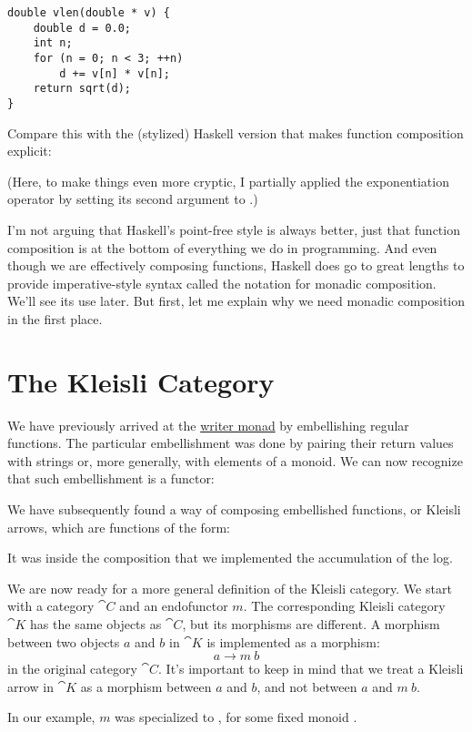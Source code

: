 \begin{Verbatim}
double vlen(double * v) {
    double d = 0.0;
    int n;
    for (n = 0; n < 3; ++n)
        d += v[n] * v[n];
    return sqrt(d);
}
\end{Verbatim}
Compare this with the (stylized) Haskell version that makes function
composition explicit:

(Here, to make things even more cryptic, I partially applied the
exponentiation operator \code{(\^{})} by setting its second argument
to .)

I'm not arguing that Haskell's point-free style is always better, just
that function composition is at the bottom of everything we do in
programming. And even though we are effectively composing functions,
Haskell does go to great lengths to provide imperative-style syntax
called the  notation for monadic composition. We'll see its
use later. But first, let me explain why we need monadic composition in
the first place.

\section{The Kleisli Category}

We have previously arrived at the
\hyperref[kleisli-categories]{writer
monad} by embellishing regular functions. The particular embellishment
was done by pairing their return values with strings or, more generally,
with elements of a monoid. We can now recognize that such embellishment
is a functor:

We have subsequently found a way of composing embellished functions, or
Kleisli arrows, which are functions of the form:

It was inside the composition that we implemented the accumulation of
the log.

We are now ready for a more general definition of the Kleisli category.
We start with a category $\cat{C}$ and an endofunctor $m$. The
corresponding Kleisli category $\cat{K}$ has the same objects as
$\cat{C}$, but its morphisms are different. A morphism between two
objects $a$ and $b$ in $\cat{K}$ is implemented as a
morphism:
\[a \to m\ b\]
in the original category $\cat{C}$. It's important to keep in mind that
we treat a Kleisli arrow in $\cat{K}$ as a morphism between $a$
and $b$, and not between $a$ and $m\ b$.

In our example, $m$ was specialized to , for
some fixed monoid .

